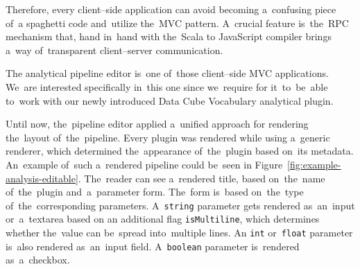 Therefore, every client--side application can avoid becoming a~confusing piece of~a
spaghetti code and~utilize the~MVC pattern. A~crucial feature is~the~RPC 
mechanism that, hand in~hand with the~Scala to JavaScript compiler brings a~way of~transparent 
client--server communication.

The analytical pipeline editor is~one of~those client--side MVC applications. We~are interested specifically in~this one since we~require for it~to~be~able to~work 
with our newly introduced Data Cube Vocabulary analytical plugin.

Until now, the~pipeline editor applied a~unified approach for rendering the~layout of~the~pipeline. Every plugin was rendered while using a~generic 
renderer, which determined the~appearance of~the~plugin based on~its metadata. An~example of~such a~rendered pipeline could be~seen in
Figure~\ref{fig:example-analysis-editable}. The~reader can see a~rendered title, based on~the~name of~the~plugin and~a~parameter form. The~form is~based on~the~type of~the~corresponding parameters. A~\texttt{string} parameter gets rendered as~an~input or~a~textarea based on
an additional flag \texttt{isMultiline}, which determines whether the~value can be~spread into~multiple lines.
An \texttt{int} or~\texttt{float} parameter is~also rendered as~an~input field. A~\texttt{boolean} parameter 
is~rendered as~a~checkbox.


